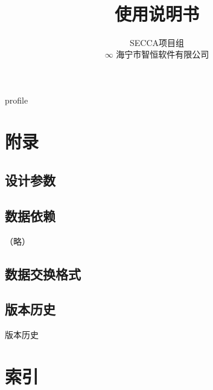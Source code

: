 \documentclass[hyperref, oneside]{book}
\title {\modtitle \\ \modsubtitle \\ 使用说明书}
\author{SECCA项目组 \\ $\infty$ \small{海宁市智恒软件有限公司}}
\begin{document}
\maketitle

\renewcommand\contentsname{目录/Contents}
\tableofcontents
\clearpage

\def\DIRNAME{.}
{profile}

\section{附录}

    \subsection{设计参数}
        \begin{landscape}
        \end{landscape}

    \subsection{数据依赖}
        （略）

    \subsection{数据交换格式}
        \begin{landscape}
%        
        \end{landscape}

    \clearpage
    \subsection{版本历史}
        \begin{center}
        \caption{版本历史} \centering
        \end{center}

\section{索引}

    \listoftables
    \listoffigures
\end{document}
